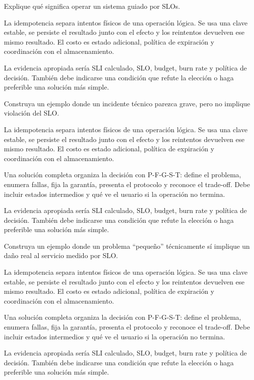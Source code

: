 \documentclass[variant=guia,cover=institutional,mode=screen]{ua-engineering-v6-article}
\begin{document}
\begin{uaexercise}
Explique qué significa operar un sistema guiado por SLOs.
\end{uaexercise}
\begin{uaanswer}
La idempotencia separa intentos físicos de una operación lógica. Se usa una clave estable, se persiste el resultado junto con el efecto y los reintentos devuelven ese mismo resultado. El costo es estado adicional, política de expiración y coordinación con el almacenamiento.

La evidencia apropiada sería SLI calculado, SLO, budget, burn rate y política de decisión. También debe indicarse una condición que refute la elección o haga preferible una solución más simple.
\end{uaanswer}

\begin{uaexercise}
Construya un ejemplo donde un incidente técnico parezca grave, pero no implique violación del SLO.
\end{uaexercise}
\begin{uaanswer}
La idempotencia separa intentos físicos de una operación lógica. Se usa una clave estable, se persiste el resultado junto con el efecto y los reintentos devuelven ese mismo resultado. El costo es estado adicional, política de expiración y coordinación con el almacenamiento.

Una solución completa organiza la decisión con P-F-G-S-T: define el problema, enumera fallas, fija la garantía, presenta el protocolo y reconoce el trade-off. Debe incluir estados intermedios y qué ve el usuario si la operación no termina.

La evidencia apropiada sería SLI calculado, SLO, budget, burn rate y política de decisión. También debe indicarse una condición que refute la elección o haga preferible una solución más simple.
\end{uaanswer}

\begin{uaexercise}
Construya un ejemplo donde un problema “pequeño” técnicamente sí implique un daño real al servicio medido por SLO.
\end{uaexercise}
\begin{uaanswer}
La idempotencia separa intentos físicos de una operación lógica. Se usa una clave estable, se persiste el resultado junto con el efecto y los reintentos devuelven ese mismo resultado. El costo es estado adicional, política de expiración y coordinación con el almacenamiento.

Una solución completa organiza la decisión con P-F-G-S-T: define el problema, enumera fallas, fija la garantía, presenta el protocolo y reconoce el trade-off. Debe incluir estados intermedios y qué ve el usuario si la operación no termina.

La evidencia apropiada sería SLI calculado, SLO, budget, burn rate y política de decisión. También debe indicarse una condición que refute la elección o haga preferible una solución más simple.
\end{uaanswer}
\end{document}
